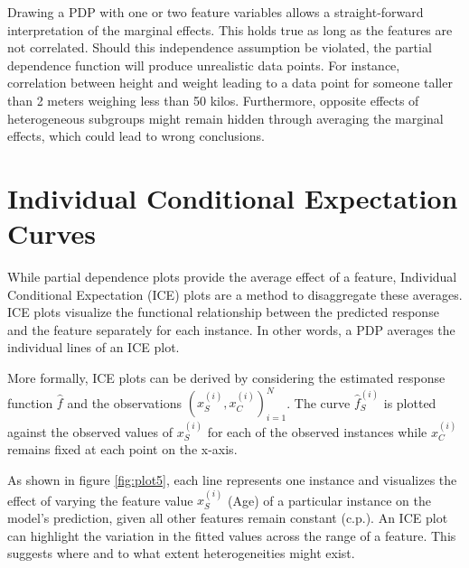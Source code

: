 \documentclass[
]{krantz}
\begin{document}
Drawing a PDP with one or two feature variables allows a straight-forward interpretation of the marginal effects. This holds true as long as the features are not correlated. Should this independence assumption be violated, the partial dependence function will produce unrealistic data points. For instance, correlation between height and weight leading to a data point for someone taller than 2 meters weighing less than 50 kilos. Furthermore, opposite effects of heterogeneous subgroups might remain hidden through averaging the marginal effects, which could lead to wrong conclusions.\citep{molnar2019}

\hypertarget{individual-conditional-expectation-curves}{%
\section{Individual Conditional Expectation Curves}\label{individual-conditional-expectation-curves}}

While partial dependence plots provide the average effect of a feature, Individual Conditional Expectation (ICE) plots are a method to disaggregate these averages. ICE plots visualize the functional relationship between the predicted response and the feature separately for each instance. In other words, a PDP averages the individual lines of an ICE plot.\citep{molnar2019}

More formally, ICE plots can be derived by considering the estimated response function \(\hat{f}\) and the observations \({(x^{(i)}_S, x^{(i)}_C)}^N_{i=1}\). The curve \(\hat{f}_S^{(i)}\) is plotted against the observed values of \(x^{(i)}_S\) for each of the observed instances while \(x^{(i)}_C\) remains fixed at each point on the x-axis.\citep{molnar2019}\citep{Goldstein2013}

As shown in figure \ref{fig:plot5}, each line represents one instance and visualizes the effect of varying the feature value \(x^{(i)}_S\) (Age) of a particular instance on the model's prediction, given all other features remain constant (c.p.). An ICE plot can highlight the variation in the fitted values across the range of a feature. This suggests where and to what extent heterogeneities might exist.
\end{document}
